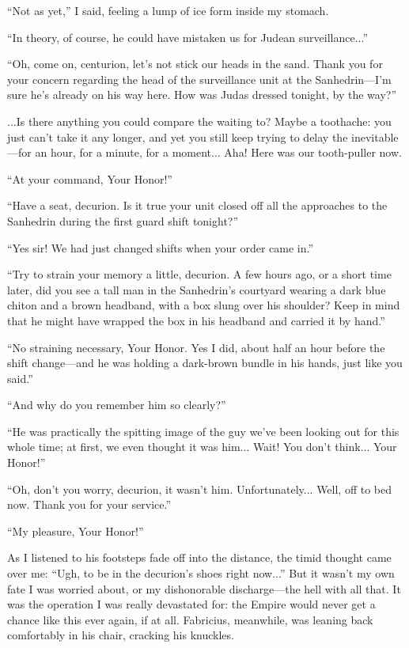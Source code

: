 ``Not as yet,'' I said, feeling a lump of ice form inside my stomach.

``In theory, of course, he could have mistaken us for Judean surveillance...''

``Oh, come on, centurion, let's not stick our heads in the sand. Thank you for your concern regarding the head of the surveillance unit at the Sanhedrin---I'm sure he's already on his way here. How was Judas dressed tonight, by the way?''

...Is there anything you could compare the waiting to? Maybe a toothache: you just can't take it any longer, and yet you still keep trying to delay the inevitable---for an hour, for a minute, for a moment... Aha! Here was our tooth-puller now.

``At your command, Your Honor!''

``Have a seat, decurion. Is it true your unit closed off all the approaches to the Sanhedrin during the first guard shift tonight?''

``Yes sir! We had just changed shifts when your order came in.''

``Try to strain your memory a little, decurion. A few hours ago, or a short time later, did you see a tall man in the Sanhedrin's courtyard wearing a dark blue chiton and a brown headband, with a box slung over his shoulder? Keep in mind that he might have wrapped the box in his headband and carried it by hand.''

``No straining necessary, Your Honor. Yes I did, about half an hour before the shift change---and he was holding a dark-brown bundle in his hands, just like you said.''

``And why do you remember him so clearly?''

``He was practically the spitting image of the guy we've been looking out for this whole time; at first, we even thought it was him... Wait! You don't think... Your Honor!''

``Oh, don't you worry, decurion, it wasn't him. Unfortunately... Well, off to bed now. Thank you for your service.'' 

``My pleasure, Your Honor!''

As I listened to his footsteps fade off into the distance, the timid thought came over me: ``Ugh, to be in the decurion's shoes right now...'' But it wasn't my own fate I was worried about, or my dishonorable discharge---the hell with all that. It was the operation I was really devastated for: the Empire would never get a chance like this ever again, if at all. Fabricius, meanwhile, was leaning back comfortably in his chair, cracking his knuckles.

